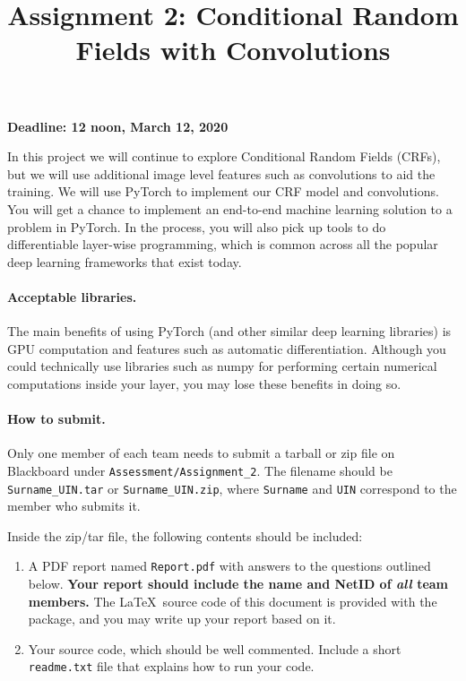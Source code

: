 \documentclass[11pt]{report}
\title{Assignment 2: Conditional Random Fields with Convolutions}
\begin{document}
\maketitle

{\bf Deadline: 12 noon, March 12, 2020}

In this project we will continue to explore Conditional Random Fields (CRFs),
but we will use additional image level features such as convolutions to aid the
training. We will use PyTorch to implement our CRF model and convolutions. You
will get a chance to implement an end-to-end machine learning solution to a
problem in PyTorch. In the process, you will also pick up tools to do
differentiable layer-wise programming, which is common across all the popular
deep learning frameworks that exist today.

\paragraph{Acceptable libraries.}
The main benefits of using PyTorch (and other similar deep learning libraries) is GPU computation and features such as automatic differentiation. Although you could technically use libraries such as numpy for performing certain numerical computations inside your layer, you may lose these benefits in doing so. 

\paragraph{How to submit.}

Only one member of each team needs to submit a tarball or zip file on Blackboard
under \verb#Assessment/Assignment_2#.
The filename should be \verb#Surname_UIN.tar# or \verb#Surname_UIN.zip#,
where \verb#Surname# and \verb#UIN# correspond to the member who submits it.

Inside the zip/tar file, the following contents should be included:
\vspace{-1em}
\begin{enumerate}

  \item  A PDF report named \verb#Report.pdf# with answers to the questions outlined below.
    {\bf Your report should include the name and NetID of \emph{all} team members.}
    The \LaTeX\ source code of this document is provided with the package, and
    you may write up your report based on it.
  \item Your source code, which should be well commented.
    Include a short \verb#readme.txt# file that explains how to run your code.
\end{enumerate}
\vspace{-1em}
\end{document}

